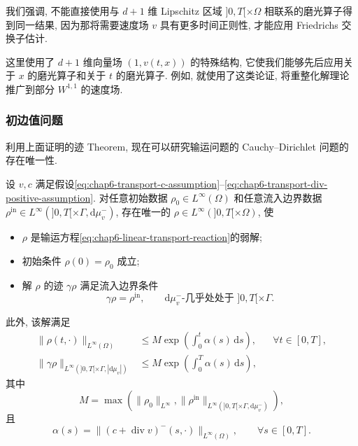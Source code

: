 \begin{sloppypar}
我们强调, 不能直接使用与 $d+1$ 维 Lipschitz 区域 $]0,T[\times\Omega$ 相联系的磨光算子得到同一结果, 因为那将需要速度场 $v$ 具有更多时间正则性, 才能应用 Friedrichs 交换子估计.

这里使用了 $d+1$ 维向量场 $(1,v(t,x))$ 的特殊结构, 它使我们能够先后应用关于 $x$ 的磨光算子和关于 $t$ 的磨光算子. 例如, 就使用了这类论证, 将重整化解理论推广到部分 $W^{1,1}$ 的速度场.

\subsubsection{初边值问题}
\label{subsec:chap6-transport-initial-boundary-problem}

利用上面证明的迹 Theorem, 现在可以研究输运问题的 Cauchy--Dirichlet 问题的存在唯一性.

\begin{Theorem}
\label{thm:chap6-transport-wellposedness}
设 $v,c$ 满足假设\eqref{eq:chap6-transport-c-assumption}--\eqref{eq:chap6-transport-div-positive-assumption}. 对任意初始数据 $\rho_0\in L^\infty(\Omega)$ 和任意流入边界数据 $\rho^{\mathrm{in}}\in L^\infty(]0,T[\times\Gamma,\mathrm d\mu_v^-)$, 存在唯一的 $\rho\in L^\infty(]0,T[\times\Omega)$, 使
\begin{itemize}
 \item $\rho$ 是输运方程\eqref{eq:chap6-linear-transport-reaction}的弱解;
 \item 初始条件 $\rho(0)=\rho_0$ 成立;
 \item 解 $\rho$ 的迹 $\gamma\rho$ 满足流入边界条件
 \[
  \gamma\rho=\rho^{\mathrm{in}},
  \qquad\mathrm d\mu_v^-\text{-几乎处处于 } ]0,T[\times\Gamma.
 \]
\end{itemize}
此外, 该解满足
\begin{subequations}
\begin{align}
 \|\rho(t,\cdot)\|_{L^\infty(\Omega)}
 &\leq M\exp\left(\int_0^t\alpha(s)\,\mathrm ds\right),
 &&\forall t\in[0,T],
\label{eq:chap6-transport-linfty-interior}\\
 \|\gamma\rho\|_{L^\infty(]0,T[\times\Gamma,|\mathrm d\mu_v|)}
 &\leq M\exp\left(\int_0^T\alpha(s)\,\mathrm ds\right),
\label{eq:chap6-transport-linfty-trace}
\end{align}
\label{eq:chap6-transport-linfty-estimates}
\end{subequations}
其中
\[
 M=\max\left(\|\rho_0\|_{L^\infty},
 \|\rho^{\mathrm{in}}\|_{L^\infty(]0,T[\times\Gamma,\mathrm d\mu_v^-)}\right),
\]
且
\begin{equation}
 \alpha(s)=\|(c+\operatorname{div}v)^-(s,\cdot)\|_{L^\infty(\Omega)},
 \qquad\forall s\in[0,T].
\label{eq:chap6-transport-alpha}
\end{equation}
\end{Theorem}


\end{sloppypar}
